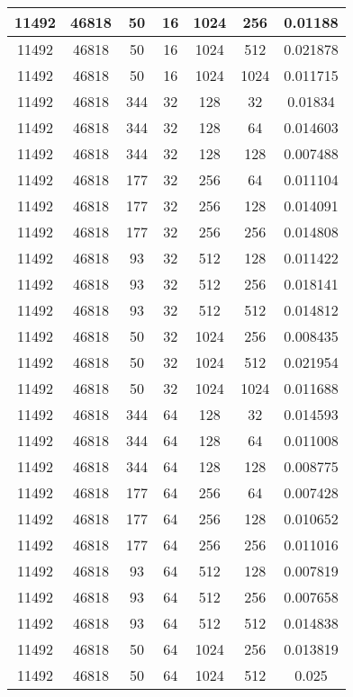 \documentclass[9pt]{article}
\begin{document}
\begin{tabular}{|c|c|c|c|c|c|c| }
\hline
11492  & 46818  & 50  & 16  & 1024  & 256  & 0.01188 \\
\hline
11492  & 46818  & 50  & 16  & 1024  & 512  & 0.021878 \\
\hline
11492  & 46818  & 50  & 16  & 1024  & 1024  & 0.011715 \\
\hline
11492  & 46818  & 344  & 32  & 128  & 32  & 0.01834 \\
\hline
11492  & 46818  & 344  & 32  & 128  & 64  & 0.014603 \\
\hline
11492  & 46818  & 344  & 32  & 128  & 128  & 0.007488 \\
\hline
11492  & 46818  & 177  & 32  & 256  & 64  & 0.011104 \\
\hline
11492  & 46818  & 177  & 32  & 256  & 128  & 0.014091 \\
\hline
11492  & 46818  & 177  & 32  & 256  & 256  & 0.014808 \\
\hline
11492  & 46818  & 93  & 32  & 512  & 128  & 0.011422 \\
\hline
11492  & 46818  & 93  & 32  & 512  & 256  & 0.018141 \\
\hline
11492  & 46818  & 93  & 32  & 512  & 512  & 0.014812 \\
\hline
11492  & 46818  & 50  & 32  & 1024  & 256  & 0.008435 \\
\hline
11492  & 46818  & 50  & 32  & 1024  & 512  & 0.021954 \\
\hline
11492  & 46818  & 50  & 32  & 1024  & 1024  & 0.011688 \\
\hline
11492  & 46818  & 344  & 64  & 128  & 32  & 0.014593 \\
\hline
11492  & 46818  & 344  & 64  & 128  & 64  & 0.011008 \\
\hline
11492  & 46818  & 344  & 64  & 128  & 128  & 0.008775 \\
\hline
11492  & 46818  & 177  & 64  & 256  & 64  & 0.007428 \\
\hline
11492  & 46818  & 177  & 64  & 256  & 128  & 0.010652 \\
\hline
11492  & 46818  & 177  & 64  & 256  & 256  & 0.011016 \\
\hline
11492  & 46818  & 93  & 64  & 512  & 128  & 0.007819 \\
\hline
11492  & 46818  & 93  & 64  & 512  & 256  & 0.007658 \\
\hline
11492  & 46818  & 93  & 64  & 512  & 512  & 0.014838 \\
\hline
11492  & 46818  & 50  & 64  & 1024  & 256  & 0.013819 \\
\hline
11492  & 46818  & 50  & 64  & 1024  & 512  & 0.025 \\

\end{tabular}
\end{document}
